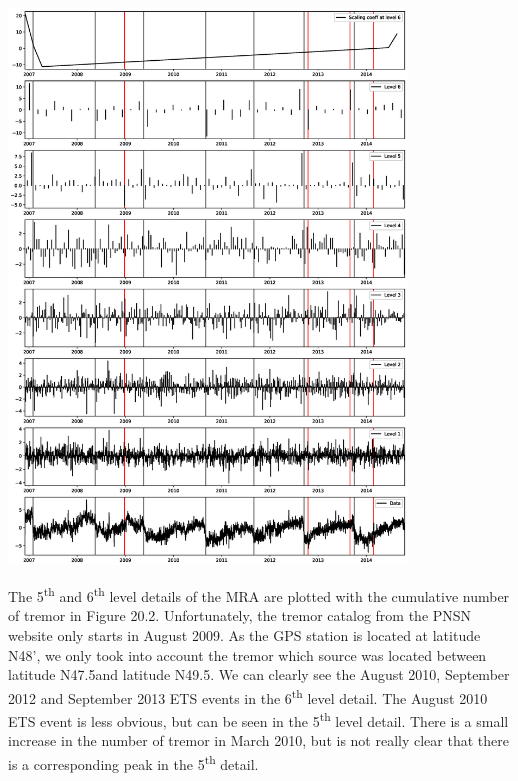 \documentclass[main.tex]{subfiles}
\begin{document}
\begin{center}
\includegraphics[width=300pt, trim={3.5cm 6cm 3.5cm 6.5cm},clip]{Figures/slowslip_results/Figure_1.eps}
\captionsetup{type=figure}
\end{center}

The 5\textsuperscript{th} and 6\textsuperscript{th} level details of the MRA are plotted with the cumulative number of tremor in Figure 20.2. Unfortunately, the tremor catalog from the PNSN website only starts in August 2009. As the GPS station is located at latitude N48', we only took into account the tremor which source was located between latitude N47.5\degree and latitude N49.5\degree. We can clearly see the August 2010, September 2012 and September 2013 ETS events in the 6\textsuperscript{th} level detail. The August 2010 ETS event is less obvious, but can be seen in the 5\textsuperscript{th} level detail. There is a small increase in the number of tremor in March 2010, but is not really clear that there is a corresponding peak in the 5\textsuperscript{th} detail.
\end{document}
